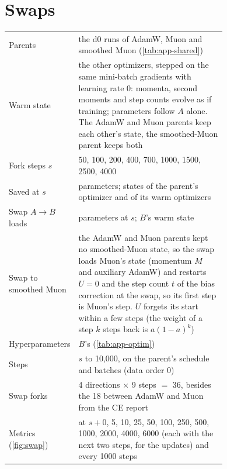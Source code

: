 \section{Swaps}
\label{app:forks}

\begin{center}\small\begin{minipage}{\linewidth}\centering
\captionsetup{type=table}
\caption{Swaps. $A$: parent's optimizer; $B$: optimizer after the swap; $s$: fork step.}
\label{tab:app-forks}
\begin{tabular}{@{}lp{0.74\linewidth}@{}}
\hline
Parents & the d0 runs of AdamW, Muon and smoothed Muon (\cref{tab:app-shared}) \\
Warm state & the other optimizers, stepped on the same mini-batch gradients with learning rate 0: momenta, second
  moments and step counts evolve as if training; parameters follow $A$ alone. The AdamW and Muon parents keep each
  other's state, the smoothed-Muon parent keeps both \\
Fork steps $s$ & 50, 100, 200, 400, 700, 1000, 1500, 2500, 4000 \\
Saved at $s$ & parameters; states of the parent's optimizer and of its warm optimizers \\
\hline
Swap $A\to B$ loads & parameters at $s$; $B$'s warm state \\
Swap to smoothed Muon & the AdamW and Muon parents kept no smoothed-Muon state, so the swap loads Muon's state (momentum
  $M$ and auxiliary AdamW) and restarts $U=0$ and the step count $t$ of the bias correction at the swap, so its first step is Muon's step. $U$ forgets its
  start within a few steps (the weight of a step $k$ steps back is $a(1-a)^k$) \\
Hyperparameters & $B$'s (\cref{tab:app-optim}) \\
Steps & $s$ to 10{,}000, on the parent's schedule and batches (data order 0) \\
Swap forks & 4 directions $\times$ 9 steps $=$ 36, besides the 18 between AdamW and Muon from the CE report \\
Metrics (\cref{fig:swap}) & at $s+{}$0, 5, 10, 25, 50, 100, 250, 500, 1000, 2000, 4000, 6000 (each with the next
  two steps, for the updates) and every 1000 steps \\
\hline
\end{tabular}\end{minipage}
\end{center}

